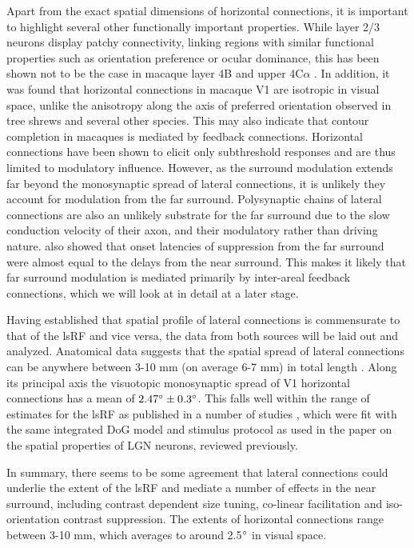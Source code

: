 Apart from the exact spatial dimensions of horizontal connections, it
is important to highlight several other functionally important properties. While
layer 2/3 neurons display patchy connectivity, linking regions with
similar functional properties such as orientation preference or ocular
dominance, this has been shown not to be the case in macaque layer 4B and
upper 4C$\alpha$ \citep{Angelucci2002}. In addition, it was found that
horizontal connections in macaque V1 are isotropic in visual space,
unlike the anisotropy along the axis of preferred orientation observed
in tree shrews \citep{Bosking1997} and several other species. This may
also indicate that contour completion in macaques is mediated by
feedback connections. Horizontal connections have been shown to
elicit only subthreshold responses \citep{Hirsch1991} and are thus
limited to modulatory influence. However, as the surround modulation
extends far beyond the monosynaptic spread of lateral connections, it
is unlikely they account for modulation from the far
surround. Polysynaptic chains of lateral connections are also an
unlikely substrate for the far surround due to the slow conduction
velocity of their axon, and their modulatory rather than driving
nature. \cite{Bair2003} also showed that
onset latencies of suppression from the far surround were almost equal
to the delays from the near surround. This makes it likely that far
surround modulation is mediated primarily by inter-areal feedback
connections, which we will look at in detail at a later stage.

Having established that spatial profile of lateral connections is
commensurate to that of the lsRF and vice versa, the data from both
sources will be laid out and analyzed. Anatomical data suggests that
the spatial spread of lateral connections can be anywhere between 3-10
mm (on average 6-7 mm) in total length \citep{Angelucci2002}. Along
its principal axis the visuotopic monosynaptic spread of V1 horizontal
connections has a mean of $2.47\degree \pm 0.3\degree$. This falls
well within the range of estimates for the lsRF as published in a
number of studies \citep{Shushruth2009,Sceniak1999,Sceniak2001}, which
were fit with the same integrated DoG model and stimulus protocol as
used in the \cite{Sceniak2006} paper on the spatial properties of LGN
neurons, reviewed previously.

In summary, there seems to be some agreement that lateral connections
could underlie the extent of the lsRF and mediate a number of effects
in the near surround, including contrast dependent size tuning,
co-linear facilitation and iso-orientation contrast suppression.  The
extents of horizontal connections range between 3-10 mm, which
averages to around 2.5$\degree$ in visual space.

